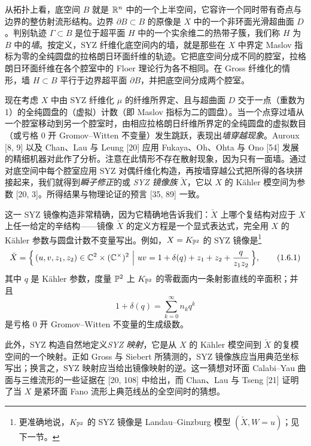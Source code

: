 从拓扑上看，底空间 $B$ 就是 $\mathbb{R}^n$ 中的一个上半空间，它容许一个同时带有奇点与边界的整仿射流形结构。边界 $\partial B \subset B$ 的原像是 $X$ 中的一个非环面光滑超曲面 $D$。判别轨迹 $\Gamma \subset B$ 是位于超平面 $H$ 中的一个实余维二的热带子簇，我们称 $H$ 为 $B$ 中的\emph{墙}。按定义，SYZ 纤维化底空间内的墙，就是那些在 $X$ 中界定 Maslov 指标为零的全纯圆盘的拉格朗日环面纤维的轨迹。它把底空间分成不同的腔室，拉格朗日环面纤维在各个腔室中的 Floer 理论行为各不相同。在 Gross 纤维化的情形，墙 $H \subset B$ 平行于边界超平面 $\partial B$，并把底空间分成两个腔室。

现在考虑 $X$ 中由 SYZ 纤维化 $\mu$ 的纤维所界定、且与超曲面 $D$ 交于一点（重数为 1）的全纯圆盘的（虚拟）计数（即 Maslov 指标为二的圆盘）。当一个点穿过墙从一个腔室移动到另一个腔室时，由相应拉格朗日纤维所界定的全纯圆盘的虚拟数目（或亏格 0 开 Gromov--Witten 不变量）发生跳跃，表现出\emph{墙穿越现象}。Auroux [8, 9] 以及 Chan、Lau 与 Leung [20] 应用 Fukaya、Oh、Ohta 与 Ono [54] 发展的精细机器对此作了分析。注意在此情形不存在散射现象，因为只有一面墙。通过对底空间中每个腔室应用 SYZ 对偶纤维化构造，再按墙穿越公式把所得的各块拼接起来，我们就得到\emph{瞬子修正}的或 \emph{SYZ 镜像族} $\check X$，它以 $X$ 的 K\"ahler 模空间为参数 [20, 3]。所得结果与物理论证的预言 [35, 89] 一致。

这一 SYZ 镜像构造非常精确，因为它精确地告诉我们：$\check X$ 上哪个复结构对应于 $X$ 上任一给定的辛结构------镜像 $\check X$ 的定义方程是一个显式表达式，完全用 $X$ 的 K\"ahler 参数与圆盘计数不变量写出。例如，$X = K_{\mathbb{P}^2}$ 的 SYZ 镜像是\footnote{更准确地说，$K_{\mathbb{P}^2}$ 的 SYZ 镜像是 Landau--Ginzburg 模型 $(\check X, W = u)$；见下一节。}
\begin{equation}
  \check X = \Bigl\{\, (u,v,z_1,z_2) \in \mathbb{C}^2 \times (\mathbb{C}^\times)^2 \ \Big|\
  uv = 1+\delta(q) + z_1 + z_2 + \frac{q}{z_1 z_2} \,\Bigr\},
  \tag{1.6.1}
\end{equation}
其中 $q$ 是 K\"ahler 参数，度量 $\mathbb{P}^2$ 上 $K_{\mathbb{P}^2}$ 的零截面内一条射影直线的辛面积；并且
\begin{equation}
  1+\delta(q) = \sum_{k=0}^{\infty} n_k q^k
  \tag{1.6.2}
\end{equation}
是亏格 0 开 Gromov--Witten 不变量的生成级数。

此外，SYZ 构造自然地定义\emph{SYZ 映射}，它是从 $X$ 的 K\"ahler 模空间到 $\check X$ 的复模空间的一个映射。正如 Gross 与 Siebert 所猜测的，SYZ 镜像族应当用典范坐标写出；换言之，SYZ 映射应当给出镜像映射的逆。这一猜想对环面 Calabi--Yau 曲面与三维流形的一些证据在 [20, 108] 中给出，而 Chan、Lau 与 Tseng [21] 证明了当 $X$ 是紧环面 Fano 流形上典范线丛的全空间时的猜想。

